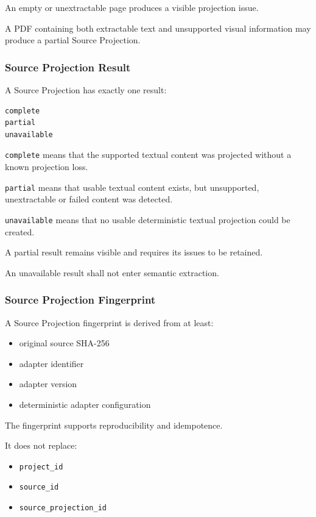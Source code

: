 An empty or unextractable page produces a visible projection issue.

A PDF containing both extractable text and unsupported visual information may produce a partial Source Projection.

\hypertarget{source-projection-result}{%
\subsubsection{Source Projection Result}\label{source-projection-result}}

A Source Projection has exactly one result:

\begin{verbatim}
complete
partial
unavailable
\end{verbatim}

\texttt{complete} means that the supported textual content was projected without a known projection loss.

\texttt{partial} means that usable textual content exists, but unsupported, unextractable or failed content was detected.

\texttt{unavailable} means that no usable deterministic textual projection could be created.

A partial result remains visible and requires its issues to be retained.

An unavailable result shall not enter semantic extraction.

\hypertarget{source-projection-fingerprint}{%
\subsubsection{Source Projection Fingerprint}\label{source-projection-fingerprint}}

A Source Projection fingerprint is derived from at least:

\begin{itemize}
\tightlist
\item
  original source SHA-256
\item
  adapter identifier
\item
  adapter version
\item
  deterministic adapter configuration
\end{itemize}

The fingerprint supports reproducibility and idempotence.

It does not replace:

\begin{itemize}
\tightlist
\item
  \texttt{project\_id}
\item
  \texttt{source\_id}
\item
  \texttt{source\_projection\_id}
\end{itemize}

